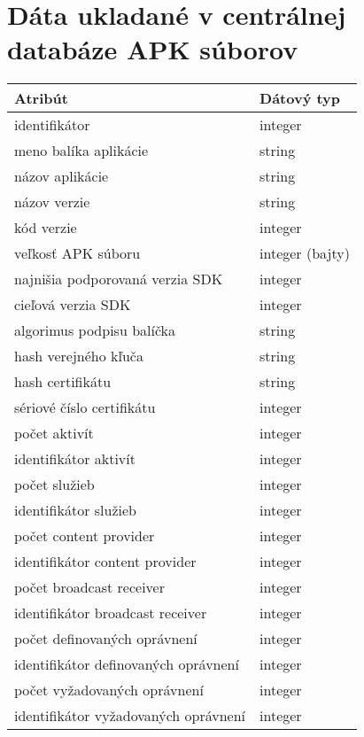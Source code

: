 \chapter{Dáta ukladané v centrálnej databáze APK súborov}
\label{zbieraneDataPriloha}
\begin{longtable}{|l|p{3.3cm}|}
\hline
\textbf{Atribút} & \textbf{Dátový typ}          \\ \hline
identifikátor                                   & integer         \\
meno balíka aplikácie                           & string 		  \\
názov aplikácie                                      & string             \\
názov verzie                                      & string      \\
kód verzie                                      & integer \\
veľkosť APK súboru                                      & integer (bajty)        \\
najnišia podporovaná verzia SDK 			& integer \\
cieľová verzia SDK							& integer \\
algorimus podpisu balíčka					& string \\
hash verejného kľuča 						& string \\
hash certifikátu							& string \\
sériové číslo certifikátu					& integer \\
počet aktivít								& integer \\
identifikátor aktivít								& integer \\
počet služieb								& integer \\
identifikátor služieb								& integer \\
počet content provider								& integer \\
identifikátor content provider								& integer \\
počet broadcast receiver								& integer \\
identifikátor broadcast receiver								& integer \\
počet definovaných oprávnení								& integer \\
identifikátor definovaných oprávnení								& integer \\
počet vyžadovaných oprávnení								& integer \\
identifikátor vyžadovaných oprávnení								& integer \\

\end{longtable}
